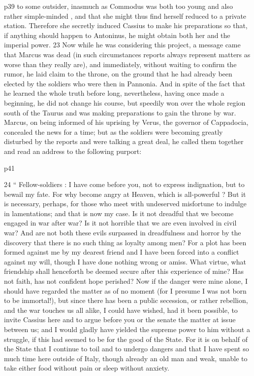 p39 to some outsider, inasmuch as Commodus was both too young and also rather simple-minded , and that she might thus find herself reduced to a private station.\texthebrew{⁠} Therefore she secretly\texthebrew{⁠} induced Cassius to make his preparations so that, if anything should happen to Antoninus, he might obtain both her and the imperial power. 23
Now while he was considering this project, a message came that Marcus was dead (in such circumstances reports always represent matters as worse than they really are), and immediately, without waiting to confirm the rumor, he laid claim to the throne, on the ground that he had already been elected by the soldiers who were then in Pannonia. And in spite of the fact that he learned the whole truth before long, nevertheless, having once made a beginning, he did not change his course, but speedily won over the whole region south of the Taurus and was making preparations to gain the throne by war. Marcus, on being informed of his uprising by Verus, the governor of Cappadocia, concealed the news for a time; but as the soldiers were becoming greatly disturbed by the reports and were talking a great deal, he called them together and read an address to the following purport:

p41

24
`` Fellow-soldiers : I have come before you, not to express indignation, but to bewail my fate. For why become angry at Heaven, which is all-powerful ? But it is necessary, perhaps, for those who meet with undeserved misfortune to indulge in lamentations; and that is now my case. Is it not dreadful that we become engaged in war after war? Is it not horrible that we are even involved in civil war? And are not both these evils surpassed in dreadfulness and horror by the discovery that there is no such thing as loyalty among men? For a plot has been formed against me by my dearest friend and I have been forced into a conflict against my will, though I have done nothing wrong or amiss. What virtue, what friendship shall henceforth be deemed secure after this experience of mine? Has not faith, has not confident hope perished? Now if the danger were mine alone, I should have regarded the matter as of no moment (for I presume I was not born to be immortal!), but since there has been a public secession, or rather rebellion, and the war touches us all alike, I could have wished, had it been possible, to invite Cassius here and to argue before you or the senate the matter at issue between us; and I would gladly have yielded the supreme power to him without a struggle, if this had seemed to be for the good of the State. For it is on behalf of the State that I continue to toil and to undergo dangers and that I have spent so much time here outside of Italy, though already an old man and weak, unable to take either food without pain or sleep without anxiety.

